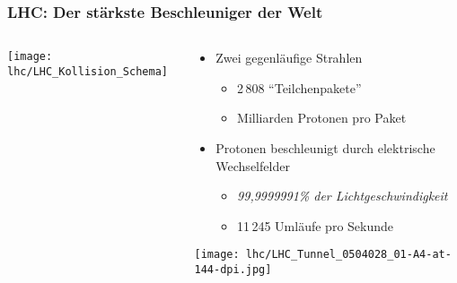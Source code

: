 { %
  \begin{frame}
    \frametitle{LHC: Der st\"arkste Beschleuniger der Welt}
    \begin{columns}
      \begin{column}{0.5\textwidth}
        \centering
      \texttt{[image: lhc/LHC\_Kollision\_Schema]}
      \end{column}
      \begin{column}{0.5\textwidth}
        \begin{block}{}
          \begin{itemize}
          \item Zwei gegenl\"aufige Strahlen
            \begin{itemize}
            \item 2\,808 ``Teilchenpakete''
            \item {} Milliarden Protonen pro Paket
            \end{itemize}
          \item Protonen beschleunigt durch elektrische Wechselfelder
            \begin{itemize}
            \item \textit{99,9999991\% der Lichtgeschwindigkeit}
            \item 11\,245 Uml\"aufe pro Sekunde
            \end{itemize}
          \end{itemize}
          \centering
          \texttt{[image: lhc/LHC\_Tunnel\_0504028\_01-A4-at-144-dpi.jpg]}
        \end{block}
      \end{column}
    \end{columns}
  \end{frame}

}
